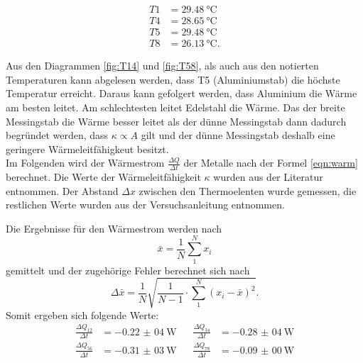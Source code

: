 \begin{align*}
  T1 &=\SI{29,48}{\celsius}\\
  T4 &=\SI{28,65}{\celsius}\\
  T5 &=\SI{29,48}{\celsius}\\
  T8 &=\SI{26,13}{\celsius}.
\end{align*}

Aus den Diagrammen \ref{fig:T14} und \ref{fig:T58}, als auch aus den notierten
Temperaturen kann abgelesen werden, dass T5 (Aluminiumstab) die höchste Temperatur erreicht.
Daraus kann gefolgert werden, dass Aluminium die Wärme am besten leitet. Am schlechtesten
leitet Edelstahl die Wärme. Das der breite Messingstab die Wärme besser leitet als der
dünne Messingstab dann dadurch begründet werden, dass $\kappa \propto A$ gilt und
der dünne Messingstab deshalb eine geringere Wärmeleitfähigkeut besitzt.\\

Im Folgenden wird der Wärmestrom $\frac{\Delta Q}{\Delta t}$
der Metalle nach der Formel \ref{eqn:warm} berechnet.
Die Werte der Wärmeleitfähigkeit $\kappa$ wurden aus der Literatur \cite{chemie} entnommen.
Der Abstand $\Delta x$ zwischen den Thermoelenten wurde gemessen, die restlichen
Werte wurden aus der Versuchsanleitung \cite{skript} entnommen.


Die Ergebnisse für den Wärmestrom werden nach
\begin{equation}
  \bar{x}=\frac{1}{N}\sum_{1}^N x_{i}
  \label{eqn:mittel}
\end{equation}
gemittelt und der zugehörige Fehler berechnet sich nach
\begin{equation}
  \Delta\bar x = \frac{1}{N}\sqrt{\frac{1}{N-1}\cdot\sum_{1}^N (x_{i}-\bar x)^2}.
  \label{eqn:gauß}
\end{equation}
Somit ergeben sich folgende Werte:
\begin{align*}
  \frac{\Delta Q_{12}}{\Delta t} &=\SI{-0,22(04)}{\W}\;\;\;    &\frac{\Delta Q_{34}}{\Delta t} &=\SI{-0,28(04)}{\W}\\
  \frac{\Delta Q_{56}}{\Delta t} &=\SI{-0,31(03)}{\W}\;\;\;    &\frac{\Delta Q_{78}}{\Delta t} &=\SI{-0,09(00)}{\W}
\end{align*}

